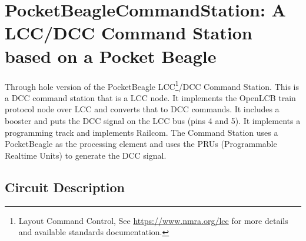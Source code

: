 %
%
%
%
% 
%
%
%
%
%
% 
%

\chapter{PocketBeagleCommandStation: A LCC/DCC Command Station based on a Pocket Beagle}

Through hole version of the PocketBeagle LCC\footnote{Layout Command Control,
See \url{https://www.nmra.org/lcc} for more details and available standards
documentation.}/DCC Command Station. This is a DCC command station that is a
LCC node. It implements the OpenLCB train protocol node over LCC and converts
that to DCC commands. It includes a booster and puts the DCC signal on the LCC
bus (pins 4 and 5). It implements a programming track and implements Railcom.
The Command Station uses a PocketBeagle as the processing element and uses the
PRUs (Programmable Realtime Units) to generate the DCC signal. 

\section{Circuit Description}
 
